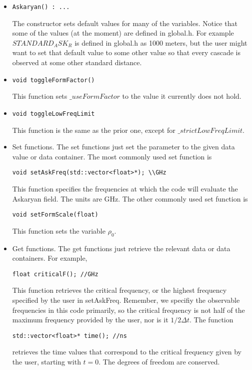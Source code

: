\documentclass[10pt]{article}
\begin{document}
\begin{itemize}
\item \begin{verbatim}
Askaryan() : ...
\end{verbatim}
The constructor sets default values for many of the variables.  Notice that some of the values (at the moment) are defined in global.h.  For example $STANDARD_ASK_R$ is defined in global.h as 1000 meters, but the user might want to set that default value to some other value so that every cascade is observed at some other standard distance.
\item \begin{verbatim}
void toggleFormFactor()
\end{verbatim}
This function sets $\_useFormFactor$ to the value it currently does not hold.
\item \begin{verbatim}
void toggleLowFreqLimit
\end{verbatim}
This function is the same as the prior one, except for $\_strictLowFreqLimit$.
\item Set functions.
The set functions just set the parameter to the given data value or data container.  The most commonly used set function is
\begin{verbatim}
void setAskFreq(std::vector<float>*); \\GHz
\end{verbatim}
This function specifies the frequencies at which the code will evaluate the Askaryan field.  The units are GHz.  The other commonly used set function is 
\begin{verbatim}
void setFormScale(float)
\end{verbatim}
This function sets the variable $\rho_0$.
\item Get functions.  The get functions just retrieve the relevant data or data containers.  For example,
\begin{verbatim}
float criticalF(); //GHz
\end{verbatim}
This function retrieves the critical frequency, or the highest frequency specified by the user in setAskFreq.  Remember, we specifiy the observable frequencies in this code primarily, so the critical frequency is not half of the maximum frequency provided by the user, nor is it $1/2\Delta t$.  The function
\begin{verbatim}
std::vector<float>* time(); //ns
\end{verbatim}
retrieves the time values that correspond to the critical frequency given by the user, starting with $t=0$.  The degrees of freedom are conserved.

\end{itemize}
\end{document}
